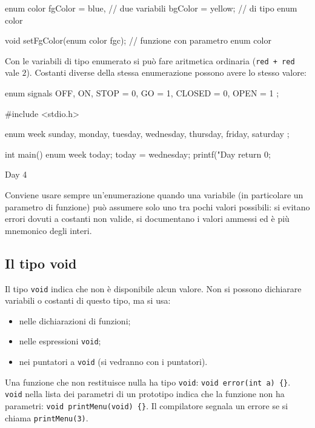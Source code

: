 \documentclass[11pt,a4paper]{article}
\begin{document}
\begin{codice}
enum color fgColor = blue,          // due variabili
           bgColor = yellow;        // di tipo enum color

void setFgColor(enum color fgc);    // funzione con parametro enum color
\end{codice}

Con le variabili di tipo enumerato si può fare aritmetica ordinaria
(\lstinline|red + red| vale $2$). Costanti diverse della stessa enumerazione
possono avere lo stesso valore:
\begin{codice}
enum signals { OFF, ON, STOP = 0, GO = 1, CLOSED = 0, OPEN = 1 };
\end{codice}

\begin{esempio}
\begin{codice}
#include <stdio.h>

enum week { sunday, monday, tuesday, wednesday, thursday, friday, saturday };

int main() {
    enum week today;
    today = wednesday;
    printf("Day %
    return 0;
}
\end{codice}
\begin{risultato}
Day 4
\end{risultato}
\end{esempio}

\begin{osservazione}
Conviene usare sempre un'enumerazione quando una variabile (in particolare un
parametro di funzione) può assumere solo uno tra pochi valori possibili: si evitano
errori dovuti a costanti non valide, si documentano i valori ammessi ed è più
mnemonico degli interi.
\end{osservazione}

\subsection{Il tipo void}

Il tipo \lstinline|void| indica che non è disponibile alcun valore. Non si possono
dichiarare variabili o costanti di questo tipo, ma si usa:
\begin{itemize}
    \item nelle dichiarazioni di funzioni;
    \item nelle espressioni \lstinline|void|;
    \item nei puntatori a \lstinline|void| (si vedranno con i puntatori).
\end{itemize}

Una funzione che non restituisce nulla ha tipo \lstinline|void|:
\lstinline|void error(int a) {}|. \lstinline|void| nella lista dei parametri di un
prototipo indica che la funzione non ha parametri:
\lstinline|void printMenu(void) {}|. Il compilatore segnala un errore se si
chiama \lstinline|printMenu(3)|.
\end{document}

